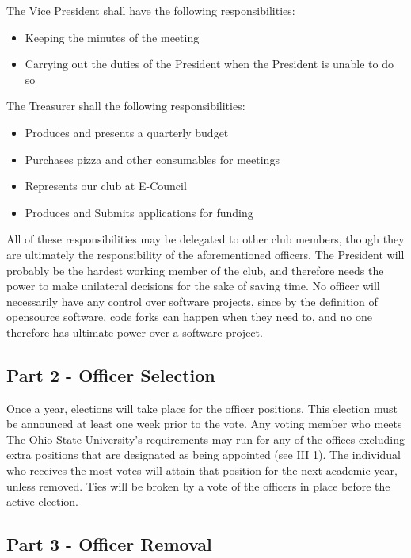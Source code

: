 \documentclass{article}
\begin{document}
	The Vice President shall have the following responsibilities:
	\begin{itemize}
		\item Keeping the minutes of the meeting
		\item Carrying out the duties of the President when the President is unable to do so
	\end{itemize}

	The Treasurer shall the following responsibilities:

	\begin{itemize}
		\item Produces and presents a quarterly budget
		\item Purchases pizza and other consumables for meetings
		\item Represents our club at E-Council
		\item Produces and Submits applications for funding
	\end{itemize}

	All of these responsibilities may be delegated to other club members, though they are ultimately the responsibility of the aforementioned officers.  The President will probably be the hardest working member of the club, and therefore needs the power to make unilateral decisions for the sake of saving time.  No officer will necessarily have any control over software projects, since by the definition of opensource software, code forks can happen when they need to, and no one therefore has ultimate power over a software project.

	\subsection{Part 2 - Officer Selection}

	Once a year, elections will take place for the officer positions.  This election must be announced at least one week prior to the vote.  Any voting member who meets The Ohio State University's requirements may run for any of the offices excluding extra positions that are designated as being appointed (see III 1).  The individual who receives the most votes will attain that position for the next academic year, unless removed.  Ties will be broken by a vote of the officers in place before the active election.

	\subsection{Part 3 - Officer Removal}
\end{document}
